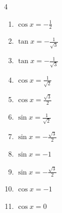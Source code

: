 \begin{multicols}{4}
\begin{enumerate}
  \item $\displaystyle \cos{x}  = -\frac{1}{2}$


  \item $\displaystyle \tan{x}  = -\frac{1}{\sqrt{3}}$


  \item $\displaystyle \tan{x}  = -\frac{1}{\sqrt{3}}$


  \item $\displaystyle \cos{x}  = \frac{1}{\sqrt{2}}$


  \item $\displaystyle \cos{x}  = \frac{\sqrt{3}}{2}$


  \item $\displaystyle \sin{x}  = \frac{1}{\sqrt{2}}$


  \item $\displaystyle \sin{x}  = -\frac{\sqrt{3}}{2}$


\columnbreak %

  \item $\displaystyle \sin{x}  = -1$


  \item $\displaystyle \sin{x}  = -\frac{\sqrt{3}}{2}$


  \item $\displaystyle \cos{x}  = -1$


  \item $\displaystyle \cos{x}  = 0$



\end{enumerate}
\end{multicols}
